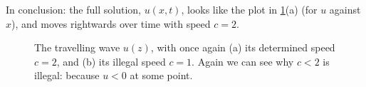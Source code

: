 \documentclass[main.tex]{subfiles}
\begin{document}
In conclusion: the full solution, $u(x,t)$, looks like the plot in \cref{fig:fk-travelling-wave}(a) (for $u$ against $x$), and moves rightwards over time with speed $c=2$.

\begin{figure}
\centering

\quad

\caption{The travelling wave $u(z)$, with once again (a) its determined speed $c=2$, and (b) its illegal speed $c=1$. Again we can see why $c<2$ is illegal: because $u<0$ at some point.}
\label{fig:fk-travelling-wave}
\end{figure}

%
\end{document}
